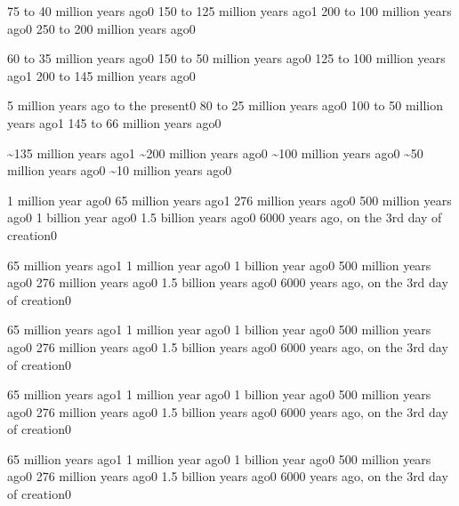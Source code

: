 {75 to 40 million years ago}{0}
{150 to 125 million years ago}{1}
{200 to 100 million years ago}{0}
{250 to 200 million years ago}{0}
\qstop

{60 to 35 million years ago}{0}
{150 to 50 million years ago}{0}
{125 to 100 million years ago}{1}
{200 to 145 million years ago}{0}
\qstop

{5 million years ago to the present}{0}
{80 to 25 million years ago}{0}
{100 to 50 million years ago}{1}
{145 to 66 million years ago}{0}
\qstop


{\textasciitilde 135 million years ago}{1}
{\textasciitilde 200 million years ago}{0}
{\textasciitilde 100 million years ago}{0}
{\textasciitilde 50 million years ago}{0}
{\textasciitilde 10 million years ago}{0}
\qstop

{1 million year ago}{0}
{65 million years ago}{1}
{276 million years ago}{0}
{500 million years ago}{0}
{1 billion year ago}{0}
{1.5 billion years ago}{0}
{6000 years ago, on the 3rd day of creation}{0}
\qstop

{65 million years ago}{1}
{1 million year ago}{0}
{1 billion year ago}{0}
{500 million years ago}{0}
{276 million years ago}{0}
{1.5 billion years ago}{0}
{6000 years ago, on the 3rd day of creation}{0}
\qstop

{65 million years ago}{1}
{1 million year ago}{0}
{1 billion year ago}{0}
{500 million years ago}{0}
{276 million years ago}{0}
{1.5 billion years ago}{0}
{6000 years ago, on the 3rd day of creation}{0}
\qstop

{65 million years ago}{1}
{1 million year ago}{0}
{1 billion year ago}{0}
{500 million years ago}{0}
{276 million years ago}{0}
{1.5 billion years ago}{0}
{6000 years ago, on the 3rd day of creation}{0}
\qstop

{65 million years ago}{1}
{1 million year ago}{0}
{1 billion year ago}{0}
{500 million years ago}{0}
{276 million years ago}{0}
{1.5 billion years ago}{0}
{6000 years ago, on the 3rd day of creation}{0}
\qstop


